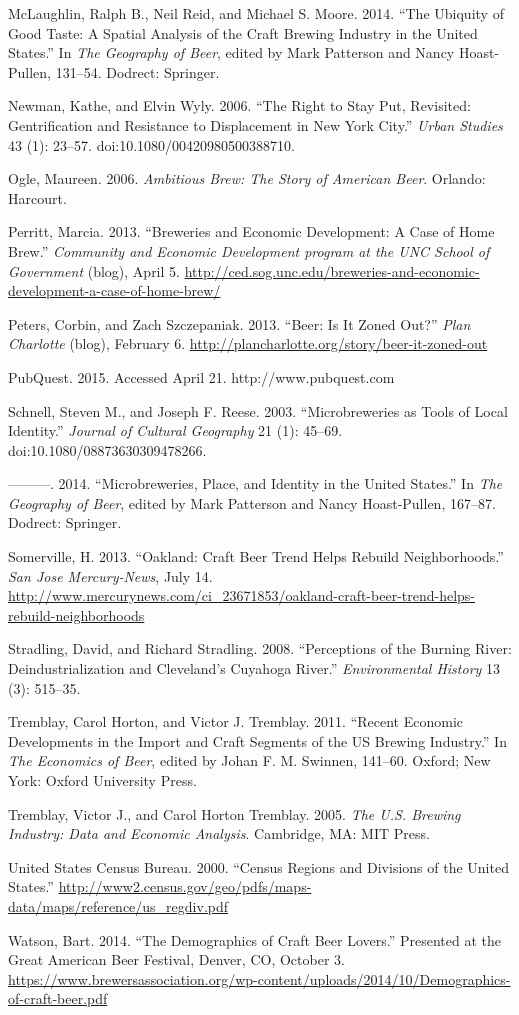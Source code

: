 \documentclass[]{article}
\begin{document}
McLaughlin, Ralph B., Neil Reid, and Michael S. Moore. 2014. ``The
Ubiquity of Good Taste: A Spatial Analysis of the Craft Brewing Industry
in the United States.'' In \emph{The Geography of Beer}, edited by Mark
Patterson and Nancy Hoast-Pullen, 131--54. Dodrect: Springer.

Newman, Kathe, and Elvin Wyly. 2006. ``The Right to Stay Put, Revisited:
Gentrification and Resistance to Displacement in New York City.''
\emph{Urban Studies} 43 (1): 23--57. doi:10.1080/00420980500388710.

Ogle, Maureen. 2006. \emph{Ambitious Brew: The Story of American Beer}.
Orlando: Harcourt.

Perritt, Marcia. 2013. ``Breweries and Economic Development: A Case of
Home Brew.'' \emph{Community and Economic Development program at the UNC
School of Government} (blog), April 5.
\url{http://ced.sog.unc.edu/breweries-and-economic-development-a-case-of-home-brew/}

Peters, Corbin, and Zach Szczepaniak. 2013. ``Beer: Is It Zoned Out?''
\emph{Plan Charlotte} (blog), February 6.
\url{http://plancharlotte.org/story/beer-it-zoned-out}

PubQuest. 2015. Accessed April 21. http://www.pubquest.com

Schnell, Steven M., and Joseph F. Reese. 2003. ``Microbreweries as Tools
of Local Identity.'' \emph{Journal of Cultural Geography} 21 (1):
45--69. doi:10.1080/08873630309478266.

---------. 2014. ``Microbreweries, Place, and Identity in the United
States.'' In \emph{The Geography of Beer}, edited by Mark Patterson and
Nancy Hoast-Pullen, 167--87. Dodrect: Springer.

Somerville, H. 2013. ``Oakland: Craft Beer Trend Helps Rebuild
Neighborhoods.'' \emph{San Jose Mercury-News}, July 14.
\url{http://www.mercurynews.com/ci\_23671853/oakland-craft-beer-trend-helps-rebuild-neighborhoods}

Stradling, David, and Richard Stradling. 2008. ``Perceptions of the
Burning River: Deindustrialization and Cleveland's Cuyahoga River.''
\emph{Environmental History} 13 (3): 515--35.

Tremblay, Carol Horton, and Victor J. Tremblay. 2011. ``Recent Economic
Developments in the Import and Craft Segments of the US Brewing
Industry.'' In \emph{The Economics of Beer}, edited by Johan F. M.
Swinnen, 141--60. Oxford; New York: Oxford University Press.

Tremblay, Victor J., and Carol Horton Tremblay. 2005. \emph{The U.S.
Brewing Industry: Data and Economic Analysis}. Cambridge, MA: MIT Press.

United States Census Bureau. 2000. ``Census Regions and Divisions of the
United States.''
\url{http://www2.census.gov/geo/pdfs/maps-data/maps/reference/us\_regdiv.pdf}

Watson, Bart. 2014. ``The Demographics of Craft Beer Lovers.'' Presented
at the Great American Beer Festival, Denver, CO, October 3.
\url{https://www.brewersassociation.org/wp-content/uploads/2014/10/Demographics-of-craft-beer.pdf}
\end{document}
